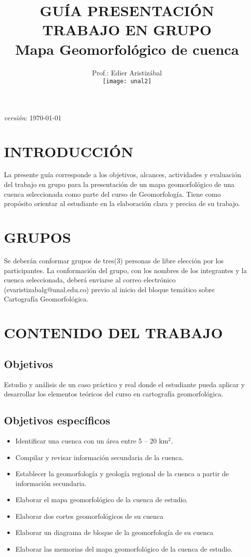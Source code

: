 \documentclass[twoside,11pt,]{article}
\title {GUÍA PRESENTACIÓN TRABAJO EN GRUPO\\ Mapa Geomorfológico de cuenca}
\author{Prof.: Edier Aristizábal\\[5ex]
\texttt{[image: unal2]}
}
\date{}
\begin{document}
\maketitle

\emph {versión}: \today

\section*{INTRODUCCIÓN}
La presente guía corresponde a los objetivos, alcances, actividades y evaluación del trabajo en grupo para la presentación de un mapa geomorfológico de una cuenca seleccionada como parte del curso de Geomorfología. Tiene como propósito orientar al estudiante en la elaboración clara y precisa de su trabajo. 

\section{GRUPOS} 
Se deberán conformar grupos de tres(3) personas de libre elección por los participantes. La conformación del grupo, con los nombres de los integrantes y la cuenca seleccionada, deberá enviarse al correo electrónico (evaristizabalg@unal.edu.co) previo al inicio del bloque temático sobre Cartografía Geomorfológica.

\section{CONTENIDO DEL TRABAJO}
\subsection{Objetivos} 
Estudio y análisis de un caso práctico y real donde el estudiante pueda aplicar y desarrollar los elementos teóricos del curso en cartografía geomorfológica.
\subsection*{Objetivos específicos}
\begin{itemize}
\item Identificar una cuenca con un área entre 5 – 20 km$^2$.
\item Compilar y revisar información secundaria de la cuenca.
\item Establecer la geomorfología y geología regional de la cuenca a partir de información secundaria.
\item Elaborar el mapa geomorfológico de la cuenca de estudio.
\item Elaborar dos cortes geomorfológicos de su cuenca
\item Elaborar un diagrama de bloque de la geomorfología de su cuenca
\item Elaborar las memorias del mapa geomorfológico de la cuenca de estudio.
\end{itemize}
\end{document}
